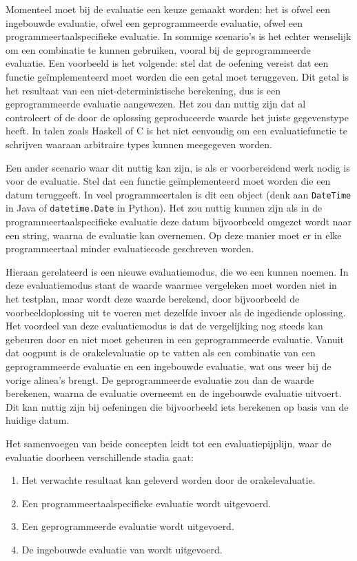 Momenteel moet bij de evaluatie een keuze gemaakt worden: het is ofwel een ingebouwde evaluatie, ofwel een geprogrammeerde evaluatie, ofwel een programmeertaalspecifieke evaluatie.
In sommige scenario's is het echter wenselijk om een combinatie te kunnen gebruiken, vooral bij de geprogrammeerde evaluatie.
Een voorbeeld is het volgende: stel dat de oefening vereist dat een functie geïmplementeerd moet worden die een getal moet teruggeven.
Dit getal is het resultaat van een niet-deterministische berekening, dus is een geprogrammeerde evaluatie aangewezen.
Het zou dan nuttig zijn dat \tested{} al controleert of de door de oplossing geproduceerde waarde het juiste gegevenstype heeft.
In talen zoals Haskell of C is het niet eenvoudig om een evaluatiefunctie te schrijven waaraan arbitraire types kunnen meegegeven worden.

Een ander scenario waar dit nuttig kan zijn, is als er voorbereidend werk nodig is voor de evaluatie.
Stel dat een functie geïmplementeerd moet worden die een datum teruggeeft.
In veel programmeertalen is dit een object (denk aan \texttt{DateTime} in Java of \texttt{datetime.Date} in Python).
Het zou nuttig kunnen zijn als in de programmeertaalspecifieke evaluatie deze datum bijvoorbeeld omgezet wordt naar een string, waarna \tested{} de evaluatie kan overnemen.
Op deze manier moet er in elke programmeertaal minder evaluatiecode geschreven worden.

Hieraan gerelateerd is een nieuwe evaluatiemodus, die we een  kunnen noemen.
In deze evaluatiemodus staat de waarde waarmee vergeleken moet worden niet in het testplan, maar wordt deze waarde berekend, door bijvoorbeeld de voorbeeldoplossing uit te voeren met dezelfde invoer als de ingediende oplossing.
Het voordeel van deze evaluatiemodus is dat de vergelijking nog steeds kan gebeuren door \tested{} en niet moet gebeuren in een geprogrammeerde evaluatie.
Vanuit dat oogpunt is de orakelevaluatie op te vatten als een combinatie van een geprogrammeerde evaluatie en een ingebouwde evaluatie, wat ons weer bij de vorige alinea's brengt.
De geprogrammeerde evaluatie zou dan de waarde berekenen, waarna \tested{} de evaluatie overneemt en de ingebouwde evaluatie uitvoert.
Dit kan nuttig zijn bij oefeningen die bijvoorbeeld iets berekenen op basis van de huidige datum.

Het samenvoegen van beide concepten leidt tot een evaluatiepijplijn, waar de evaluatie doorheen verschillende stadia gaat:

\begin{enumerate}
    \item Het verwachte resultaat kan geleverd worden door de orakelevaluatie.
    \item Een programmeertaalspecifieke evaluatie wordt uitgevoerd.
    \item Een geprogrammeerde evaluatie wordt uitgevoerd.
    \item De ingebouwde evaluatie van \tested{} wordt uitgevoerd.
\end{enumerate}

